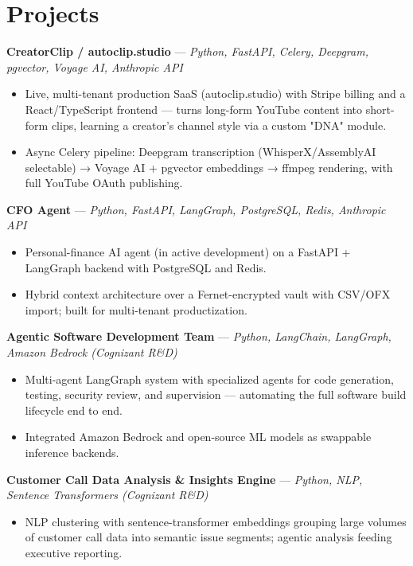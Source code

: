 \documentclass[10pt]{article}
\begin{document}
\section*{Projects}
\noindent\textbf{CreatorClip / autoclip.studio} --- \textit{Python, FastAPI, Celery, Deepgram, pgvector, Voyage AI, Anthropic API}\par
\begin{itemize}
  \item Live, multi-tenant production SaaS (autoclip.studio) with Stripe billing and a React/TypeScript frontend — turns long-form YouTube content into short-form clips, learning a creator's channel style via a custom "DNA" module.
  \item Async Celery pipeline: Deepgram transcription (WhisperX/AssemblyAI selectable) → Voyage AI + pgvector embeddings → ffmpeg rendering, with full YouTube OAuth publishing.
\end{itemize}
\noindent\textbf{CFO Agent} --- \textit{Python, FastAPI, LangGraph, PostgreSQL, Redis, Anthropic API}\par
\begin{itemize}
  \item Personal-finance AI agent (in active development) on a FastAPI + LangGraph backend with PostgreSQL and Redis.
  \item Hybrid context architecture over a Fernet-encrypted vault with CSV/OFX import; built for multi-tenant productization.
\end{itemize}
\noindent\textbf{Agentic Software Development Team} --- \textit{Python, LangChain, LangGraph, Amazon Bedrock (Cognizant R\&D)}\par
\begin{itemize}
  \item Multi-agent LangGraph system with specialized agents for code generation, testing, security review, and supervision — automating the full software build lifecycle end to end.
  \item Integrated Amazon Bedrock and open-source ML models as swappable inference backends.
\end{itemize}
\noindent\textbf{Customer Call Data Analysis \& Insights Engine} --- \textit{Python, NLP, Sentence Transformers (Cognizant R\&D)}\par
\begin{itemize}
  \item NLP clustering with sentence-transformer embeddings grouping large volumes of customer call data into semantic issue segments; agentic analysis feeding executive reporting.
\end{itemize}
\end{document}

